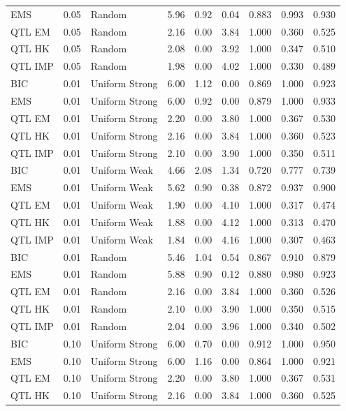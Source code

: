 \documentclass[
  12pt,
]{article}
\begin{document}
\begin{table}
{\begin{tabular}[t]{lrlrrrrrr}
EMS & 0.05 & Random & 5.96 & 0.92 & 0.04 & 0.883 & 0.993 & 0.930\\
QTL EM & 0.05 & Random & 2.16 & 0.00 & 3.84 & 1.000 & 0.360 & 0.525\\
QTL HK & 0.05 & Random & 2.08 & 0.00 & 3.92 & 1.000 & 0.347 & 0.510\\
QTL IMP & 0.05 & Random & 1.98 & 0.00 & 4.02 & 1.000 & 0.330 & 0.489\\
\addlinespace
BIC & 0.01 & Uniform Strong & 6.00 & 1.12 & 0.00 & 0.869 & 1.000 & 0.923\\
EMS & 0.01 & Uniform Strong & 6.00 & 0.92 & 0.00 & 0.879 & 1.000 & 0.933\\
QTL EM & 0.01 & Uniform Strong & 2.20 & 0.00 & 3.80 & 1.000 & 0.367 & 0.530\\
QTL HK & 0.01 & Uniform Strong & 2.16 & 0.00 & 3.84 & 1.000 & 0.360 & 0.523\\
QTL IMP & 0.01 & Uniform Strong & 2.10 & 0.00 & 3.90 & 1.000 & 0.350 & 0.511\\
\addlinespace
BIC & 0.01 & Uniform Weak & 4.66 & 2.08 & 1.34 & 0.720 & 0.777 & 0.739\\
EMS & 0.01 & Uniform Weak & 5.62 & 0.90 & 0.38 & 0.872 & 0.937 & 0.900\\
QTL EM & 0.01 & Uniform Weak & 1.90 & 0.00 & 4.10 & 1.000 & 0.317 & 0.474\\
QTL HK & 0.01 & Uniform Weak & 1.88 & 0.00 & 4.12 & 1.000 & 0.313 & 0.470\\
QTL IMP & 0.01 & Uniform Weak & 1.84 & 0.00 & 4.16 & 1.000 & 0.307 & 0.463\\
\addlinespace
BIC & 0.01 & Random & 5.46 & 1.04 & 0.54 & 0.867 & 0.910 & 0.879\\
EMS & 0.01 & Random & 5.88 & 0.90 & 0.12 & 0.880 & 0.980 & 0.923\\
QTL EM & 0.01 & Random & 2.16 & 0.00 & 3.84 & 1.000 & 0.360 & 0.526\\
QTL HK & 0.01 & Random & 2.10 & 0.00 & 3.90 & 1.000 & 0.350 & 0.515\\
QTL IMP & 0.01 & Random & 2.04 & 0.00 & 3.96 & 1.000 & 0.340 & 0.502\\
\addlinespace
BIC & 0.10 & Uniform Strong & 6.00 & 0.70 & 0.00 & 0.912 & 1.000 & 0.950\\
EMS & 0.10 & Uniform Strong & 6.00 & 1.16 & 0.00 & 0.864 & 1.000 & 0.921\\
QTL EM & 0.10 & Uniform Strong & 2.20 & 0.00 & 3.80 & 1.000 & 0.367 & 0.531\\
QTL HK & 0.10 & Uniform Strong & 2.16 & 0.00 & 3.84 & 1.000 & 0.360 & 0.525\\

\end{tabular}}
\end{table}
\end{document}
